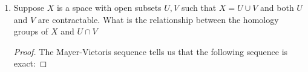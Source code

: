 \documentclass{article}
\begin{document}
\begin{enumerate}
\begin{proof}
		When $n =0$ we have 
		\[H_0 (\mathbb{R}) \otimes H_0 (\mathbb{R} \backslash 0) = \mathbb{Z} \otimes \mathbb{Z}^2 \cong \mathbb{Z}^2\]
		
		When $n>0$ we have 
		\[ H_i(\mathbb{R}) \otimes H_{n-i}(\mathbb{R}\backslash 0) = \left (\begin{cases} 
			\mathbb{Z} \otimes 0 & i=0\\  
			0 \otimes 0 & i \neq 0,n\\
			0 \otimes \mathbb{Z}^2 & i = n\\
			\end{cases} \right) = 0 ,\]
		and so
		\[H_{n}( \mathbb{R} \times \mathbb{R}\backslash 0) = \begin{cases} \mathbb{Z}^2 & n=0 \\ 0 &\text{else} \end{cases}.\]
		
		We now use (\ref{seq:Kunneth}) with $A = \mathbb{R} \backslash 0$ and $B = \mathbb{R} \times \mathbb{R} \backslash 0$ and the fact that every homology group of $A$ is torsion-free to see
		\[ \bigoplus_i \left ( H_i(\mathbb{R} \backslash 0) \otimes H_{n-i}(\mathbb{R} \times \mathbb{R}\backslash 0) \right ) \cong H_n(\mathbb{R} \backslash 0 \times\mathbb{R}\times \mathbb{R}\backslash 0) \cong H_n(X).\]
		
		Arguing as above we see when $n=0$ that
		\[ H_0(\mathbb{R} \backslash 0) \otimes H_0(\mathbb{R} \times \mathbb{R}\backslash 0) = \mathbb{Z}^2 \otimes \mathbb{Z}^2 \cong \mathbb{Z}^4,\]
		and 
		for $n >0$ 
		\[ H_i(\mathbb{R} \backslash 0 ) \otimes H_{n-i}(\mathbb{R} \times \mathbb{R}\backslash 0) = \left (\begin{cases} 
			\mathbb{Z}^2 \otimes 0 & i=0\\  
			0 \otimes 0 & i \neq 0,n\\
			0 \otimes \mathbb{Z}^2 & i = n\\
			\end{cases} \right) = 0 ,\]
		and so 
		\[ H_n(X) = \begin{cases} \mathbb{Z}^4 & n=0 \\ 0 & \text{else} \end{cases}\]
	\end{proof}
	
	
\item Suppose $X$ is a space with open subsets $U,V$ such that $X = U \cup V$ and both $U$ and $V$ are contractable. What is the relationship between the homology groups of $X$ and $U\cap V$

\begin{proof}
The Mayer-Vietoris sequence tells us that the following sequence is exact:


\end{proof}
\end{enumerate}
\end{document}
